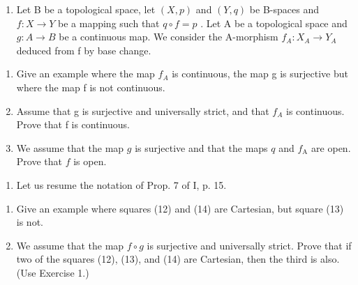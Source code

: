 \exercisegroup

\begin{enumerate}
\def\labelenumi{\arabic{enumi})}
\tightlist
\item
  Let B be a topological space, let \((X,p)\) and \((Y,q)\) be B-spaces and \(f\colon X\to Y\) be a mapping such that \(q\circ f=p\) . Let A be a topological space and \(g\colon A\to B\) be a continuous map. We consider the A-morphism \(f_{A}\colon X_{A}\to Y_{A}\) deduced from f by base change.
\end{enumerate}

\begin{enumerate}
\def\labelenumi{\alph{enumi})}
\item
  Give an example where the map \(f_{A}\) is continuous, the map g is surjective but where the map f is not continuous.
\item
  Assume that g is surjective and universally strict, and that \(f_{A}\) is continuous. Prove that f is continuous.
\item
  We assume that the map \(g\) is surjective and that the maps \(q\) and \(f_{\mathrm{A}}\) are open. Prove that \(f\) is open.
\end{enumerate}

\begin{enumerate}
\def\labelenumi{\arabic{enumi})}
\setcounter{enumi}{1}
\tightlist
\item
  Let us resume the notation of Prop. 7 of I, p. 15.
\end{enumerate}

\begin{enumerate}
\def\labelenumi{\alph{enumi})}
\item
  Give an example where squares (12) and (14) are Cartesian, but square (13) is not.
\item
  We assume that the map \(f \circ g\) is surjective and universally strict. Prove that if two of the squares (12), (13), and (14) are Cartesian, then the third is also. (Use Exercise 1.)
\end{enumerate}

